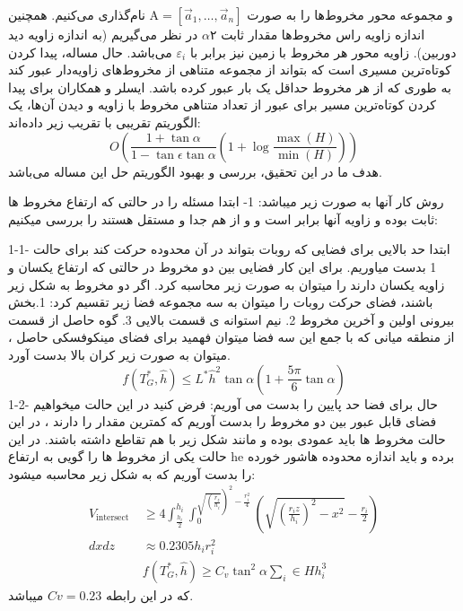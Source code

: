 \documentclass[12pt]{book}
\begin{document}
و مجموعه محور مخروط‌‌‌ها را به صورت $\mathrm{A}=\left[\vec{a}_{1}, \ldots, \vec{a}_{n}\right]$
نام‌گذاری می‌کنیم. همچنین اندازه زاویه راس مخروط‌‌‌ها مقدار ثابت ۲$
\alpha$
در نظر می‌گیریم (به اندازه زاویه دید دوربین). زاویه محور هر مخروط 
 با زمین نیز برابر با $
\varepsilon_{i}$
می‌باشد. حال مساله،‌‌ پیدا کردن کوتاه‌ترین مسیری است که بتواند از مجموعه متناهی از مخروط‌‌‌های زاویه‌دار عبور کند به طوری که از هر مخروط حداقل یک بار عبور کرده باشد.
ایسلر و همکاران برای پیدا کردن کوتاه‌ترین مسیر برای عبور از تعداد متناهی مخروط با زاویه و دیدن آن‌‌‌ها، یک الگوریتم تقریبی با تقریب زیر داده‌اند:
\begin{equation}
O\left(\frac{1+\tan \alpha}{1-\tan \epsilon \tan \alpha}\left(1+\log \frac{\max (H)}{\min (H)}\right)\right)
\end{equation}
هدف ما در این تحقیق، بررسی و بهبود الگوریتم حل این مساله می‌باشد.

روش کار آنها به صورت زیر میباشد:
1-
ابتدا مسئله را در حالتی که ارتفاع مخروط ها ثابت بوده و زاویه آنها برابر است و و از هم جدا و مستقل هستند را بررسی میکنیم:

1-1-	ابتدا حد بالایی برای فضایی که روبات بتواند در آن محدوده حرکت کند برای حالت 1 بدست میاوریم. برای این کار فضایی بین دو مخروط در حالتی که ارتفاع یکسان و زاویه یکسان دارند را میتوان به صورت زیر محاسبه کرد. اگر دو مخروط به شکل زیر باشند، فضای حرکت روبات را میتوان به سه مجموعه فضا زیر تقسیم کرد:
1.بخش بیرونی اولین و آخرین مخروط 
2. نیم استوانه ی قسمت بالایی 
3. گوه حاصل از قسمت از منطقه میانی 
که با جمع این سه فضا میتوان فهمید برای فضای مینکوفسکی حاصل ، میتوان به صورت زیر کران بالا بدست آورد.
\begin{equation}
f\left(T_{G}^{*}, \hat{h}\right) \leqslant L^{*} \hat{h}^{2} \tan \alpha\left(1+\frac{5 \pi}{6} \tan \alpha\right)
\end{equation}
1-2-	حال برای فضا حد پایین را بدست می آوریم:
فرض کنید در این حالت میخواهیم فضای قابل عبور بین دو مخروط را بدست آوریم که کمترین مقدار را دارند ، در این حالت مخروط ها باید عمودی بوده و مانند شکل زیر با هم تقاطع داشته باشند. در این حالت یکی از مخروط ها را گویی به ارتفاع he برده و باید اندازه محدوده هاشور خورده را بدست آوریم که به شکل زیر محاسبه میشود:
\begin{equation}
\begin{aligned}
V_{\text {intersect }} & \geq 4 \int_{\frac{h_{i}}{2}}^{h_{i}} \int_{0}^{\left.\sqrt{\left(\frac{r_{z}}{h_{i}}\right.}\right)^{2}-\frac{r_{i}^{2}}{4}}\left(\sqrt{\left(\frac{r_{i} z}{h_{i}}\right)^{2}-x^{2}}-\frac{r_{i}}{2}\right) \\
d x d z & \approx 0.2305 h_{i} r_{i}^{2} \\
& f\left(T_{G}^{*}, \hat{h}\right) \geqslant C_{v} \tan ^{2} \alpha \sum_{i} \in H h_{i}^{3}
\end{aligned}
\end{equation}
که در این رابطه
$ Cv=0.23 $ 
میباشد.
\end{document}
